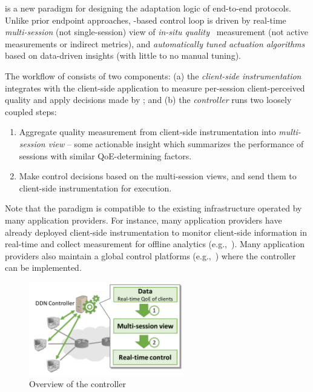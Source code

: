 \ddn is a new paradigm for designing the adaptation logic of 
end-to-end protocols. 
Unlike prior endpoint approaches, 
\ddn-based control loop is driven by real-time
{\em multi-session} (not single-session) view of 
{\em in-situ quality}~\cite{insitu} 
measurement (not active
measurements or indirect metrics), 
and {\em automatically tuned actuation algorithms} based
on data-driven insights (with little to no manual tuning).

The workflow of \ddn consists of two components:
(a) the {\em client-side instrumentation} integrates with the 
client-side application%
to measure per-session client-perceived quality and apply 
decisions made by \ddn; and (b) the {\em \ddn controller} 
runs two loosely coupled steps:
\begin{enumerate}
\item Aggregate quality measurement from client-side 
instrumentation into {\em multi-session view} -- 
some actionable insight which summarizes the performance of
sessions with similar QoE-determining factors.
\item Make control decisions based on the multi-session 
views, and send them to client-side instrumentation for execution.
\end{enumerate}

Note that the \ddn paradigm is compatible to 
the existing infrastructure operated by many application 
providers. For instance, many application providers 
have already deployed client-side instrumentation to
monitor client-side information in real-time and collect
measurement for offline analytics (e.g.,~\cite{sigcomm11}).
Many application providers also maintain a global control
platforms (e.g.,~\cite{c3,via,footprint,chen2015end}) 
where the \ddn controller can be implemented.


\begin{figure}[t!]
\centering
\includegraphics[width=0.6\textwidth]{figures/overview-ddn-arch.pdf}
\caption{Overview of the \ddn controller}
\label{fig:intro-contribution}
\end{figure}

